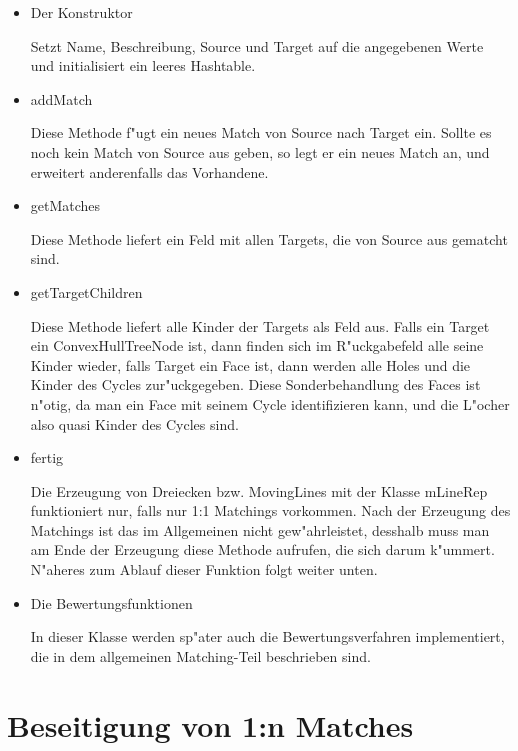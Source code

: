 \documentclass[a4paper,10pt,twoside]{scrreprt}
\begin{document}
\begin{itemize}

\item Der Konstruktor

Setzt Name, Beschreibung, Source und Target auf die angegebenen Werte und initialisiert ein leeres Hashtable.

\item addMatch

Diese Methode f"ugt ein neues Match von Source nach Target ein. Sollte es noch kein Match von Source aus geben, so legt er ein neues Match an, und erweitert anderenfalls das Vorhandene.

\item getMatches

Diese Methode liefert ein Feld mit allen Targets, die von Source aus gematcht sind.

\item getTargetChildren

Diese Methode liefert alle Kinder der Targets als Feld aus. Falls ein Target ein ConvexHullTreeNode ist, dann finden sich im R"uckgabefeld alle seine Kinder  wieder, falls Target ein Face ist, dann werden alle Holes und die Kinder des Cycles zur"uckgegeben. Diese Sonderbehandlung des Faces ist n"otig, da man ein Face mit seinem Cycle identifizieren kann, und die L"ocher also quasi Kinder des Cycles sind.

\item fertig

Die Erzeugung von Dreiecken bzw. MovingLines mit der Klasse mLineRep funktioniert nur, falls nur 1:1 Matchings vorkommen. Nach der Erzeugung des Matchings ist das im Allgemeinen nicht gew"ahrleistet, desshalb muss man am Ende der Erzeugung diese Methode aufrufen, die sich darum k"ummert. N"aheres zum Ablauf dieser Funktion folgt weiter unten.

\item Die Bewertungsfunktionen

In dieser Klasse werden sp"ater auch die Bewertungsverfahren implementiert, die in dem allgemeinen Matching-Teil beschrieben sind.

\end{itemize}

\section{Beseitigung von 1:n Matches}
\end{document}
